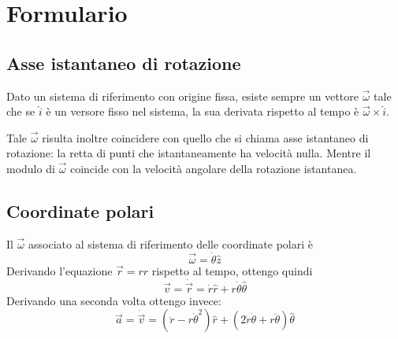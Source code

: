 \documentclass[../main.tex]{subfiles}
\begin{document}
\section{Formulario}
\setcounter{equation}{0}
\renewcommand{\theequation}{F.\arabic{equation}}
\subsection{Asse istantaneo di rotazione}
Dato un sistema di riferimento con origine fissa, esiste sempre un vettore $\vec\omega$ tale che se $\hat i$ è un versore fisso nel sistema, la sua derivata rispetto al tempo è $\vec\omega\times\hat i$.

Tale $\vec\omega$ risulta inoltre coincidere con quello che si chiama asse istantaneo di rotazione: la retta di punti che istantaneamente ha velocità nulla. Mentre il modulo di $\vec\omega$ coincide con la velocità angolare della rotazione istantanea.

\subsection{Coordinate polari} 
Il $\vec\omega$ associato al sistema di riferimento delle coordinate polari è
\begin{equation}\label{OmegaPolari}
	\vec{\omega}=\dot{\theta}\hat{z}
\end{equation}
Derivando l'equazione $\vec{r}=r\hat{r}$ rispetto al tempo, ottengo quindi
\begin{equation}\label{VelCooPolari}
	\vec{v}=\dot{\vec{r}}=\dot{r}\hat{r}+r\dot{\theta}\hat{\theta}
\end{equation}
Derivando una seconda volta ottengo invece:
\begin{equation}\label{AccCooPolari}
	\vec{a}=\dot{\vec{v}} =(\ddot{r}-r\dot{\theta}^2)\hat{r}+(2\dot{r}\dot{\theta}+r\ddot{\theta})\hat{\theta}
\end{equation}
\end{document}
